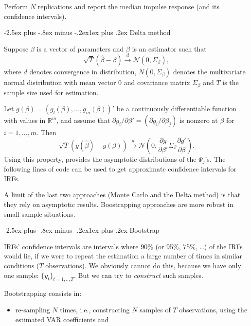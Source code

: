 \documentclass[
  11pt,
]{book}
\makeatletter
\providecommand{\tightlist}{%
  \setlength{\itemsep}{0pt}\setlength{\parskip}{0pt}}
\renewcommand\subsection{\@startsection{subsection}{2}{\z@}
  {-2.5ex plus -.8ex minus -.2ex}{1ex plus .2ex}
  {\normalfont\large\bfseries\color{TextbookInk}}}
\theoremstyle{definition}
\theoremstyle{definition}
\theoremstyle{definition}
\theoremstyle{definition}
\theoremstyle{remark}
\makeatother
\begin{document}
Perform \(N\) replications and report the median impulse response (and its confidence intervals).

\subsection{Delta method}\label{Delta}

Suppose \(\beta\) is a vector of parameters and \(\beta\) is an estimator such that
\[
\sqrt{T}(\hat\beta-\beta)\overset{d}{\rightarrow}\mathcal{N}(0,\Sigma_\beta),
\]
where \(d\) denotes convergence in distribution, \(N(0,\Sigma_\beta)\) denotes the multivariate normal distribution with mean vector 0 and covariance matrix \(\Sigma_\beta\) and \(T\) is the sample size used for estimation.

Let \(g(\beta) = (g_l(\beta),..., g_m(\beta))'\) be a continuously differentiable function with values in \(\mathbb{R}^m\), and assume that \(\partial g_i/\partial
\beta' = (\partial g_i/\partial \beta_j)\) is nonzero at \(\beta\) for \(i = 1,\dots, m\). Then
\[
\sqrt{T}(g(\hat\beta)-g(\beta))\overset{d}{\rightarrow}\mathcal{N}\left(0,\frac{\partial g}{\partial \beta'}\Sigma_\beta\frac{\partial g'}{\partial \beta}\right).
\]
Using this property, \citet{Lutkepohl_1990} provides the asymptotic distributions of the \(\Psi_j\)'s. The following lines of code can be used to get approximate confidence intervals for IRFs.

A limit of the last two approaches (Monte Carlo and the Delta method) is that they rely on asymptotic results. Boostrapping approaches are more robust in small-sample situations.

\subsection{Bootstrap}\label{Bootstrap}

IRFs' confidence intervals are intervals where 90\% (or 95\%, 75\%, \ldots) of the IRFs would lie, if we were to repeat the estimation a large number of times in similar conditions (\(T\) observations). We obviously cannot do this, because we have only one sample: \(\{y_t\}_{t=1,..,T}\). But we can try to \emph{construct} such samples.

Bootstrapping consists in:

\begin{itemize}
\tightlist
\item
  re-sampling \(N\) times, i.e., constructing \(N\) samples of \(T\) observations, using the estimated
  VAR coefficients and
\end{itemize}
\end{document}

